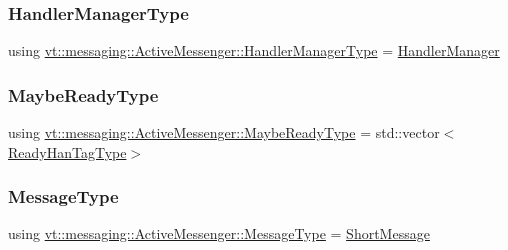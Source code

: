 \subsubsection{\texorpdfstring{Handler\+Manager\+Type}{HandlerManagerType}}
{\footnotesize\ttfamily using \hyperlink{structvt_1_1messaging_1_1_active_messenger_ac7e9165df6550ea333f8eb018a5a0e60}{vt\+::messaging\+::\+Active\+Messenger\+::\+Handler\+Manager\+Type} =  \hyperlink{structvt_1_1_handler_manager}{Handler\+Manager}}

\mbox{\label{structvt_1_1messaging_1_1_active_messenger_a745d5e8cad8c2f67d20479afacc6e134}} 
\subsubsection{\texorpdfstring{Maybe\+Ready\+Type}{MaybeReadyType}}
{\footnotesize\ttfamily using \hyperlink{structvt_1_1messaging_1_1_active_messenger_a745d5e8cad8c2f67d20479afacc6e134}{vt\+::messaging\+::\+Active\+Messenger\+::\+Maybe\+Ready\+Type} =  std\+::vector$<$\hyperlink{structvt_1_1messaging_1_1_active_messenger_a98bb74aa4a561161dd7c7073dcd5f1d3}{Ready\+Han\+Tag\+Type}$>$}

\mbox{\label{structvt_1_1messaging_1_1_active_messenger_a720a2b1e7462d414b2a51d9fe005eca9}} 
\subsubsection{\texorpdfstring{Message\+Type}{MessageType}}
{\footnotesize\ttfamily using \hyperlink{structvt_1_1messaging_1_1_active_messenger_a720a2b1e7462d414b2a51d9fe005eca9}{vt\+::messaging\+::\+Active\+Messenger\+::\+Message\+Type} =  \hyperlink{namespacevt_a1125ac1da6c0bbf141e0ea0739d7602d}{Short\+Message}}

\mbox{\label{structvt_1_1messaging_1_1_active_messenger_a18bbfbf9ecd82b33f6fc475b2e5290a5}} 

